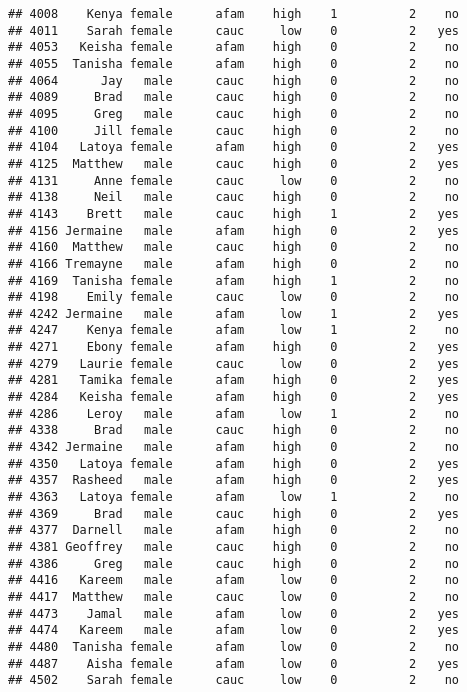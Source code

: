 \documentclass[
]{article}
\begin{document}
\begin{verbatim}
## 4008    Kenya female      afam    high    1          2    no
## 4011    Sarah female      cauc     low    0          2   yes
## 4053   Keisha female      afam    high    0          2    no
## 4055  Tanisha female      afam    high    0          2    no
## 4064      Jay   male      cauc    high    0          2    no
## 4089     Brad   male      cauc    high    0          2    no
## 4095     Greg   male      cauc    high    0          2    no
## 4100     Jill female      cauc    high    0          2    no
## 4104   Latoya female      afam    high    0          2   yes
## 4125  Matthew   male      cauc    high    0          2   yes
## 4131     Anne female      cauc     low    0          2    no
## 4138     Neil   male      cauc    high    0          2    no
## 4143    Brett   male      cauc    high    1          2   yes
## 4156 Jermaine   male      afam    high    0          2   yes
## 4160  Matthew   male      cauc    high    0          2    no
## 4166 Tremayne   male      afam    high    0          2    no
## 4169  Tanisha female      afam    high    1          2    no
## 4198    Emily female      cauc     low    0          2    no
## 4242 Jermaine   male      afam     low    1          2   yes
## 4247    Kenya female      afam     low    1          2    no
## 4271    Ebony female      afam    high    0          2   yes
## 4279   Laurie female      cauc     low    0          2   yes
## 4281   Tamika female      afam    high    0          2   yes
## 4284   Keisha female      afam    high    0          2   yes
## 4286    Leroy   male      afam     low    1          2    no
## 4338     Brad   male      cauc    high    0          2    no
## 4342 Jermaine   male      afam    high    0          2    no
## 4350   Latoya female      afam    high    0          2   yes
## 4357  Rasheed   male      afam    high    0          2   yes
## 4363   Latoya female      afam     low    1          2    no
## 4369     Brad   male      cauc    high    0          2   yes
## 4377  Darnell   male      afam    high    0          2    no
## 4381 Geoffrey   male      cauc    high    0          2    no
## 4386     Greg   male      cauc    high    0          2    no
## 4416   Kareem   male      afam     low    0          2    no
## 4417  Matthew   male      cauc     low    0          2    no
## 4473    Jamal   male      afam     low    0          2   yes
## 4474   Kareem   male      afam     low    0          2   yes
## 4480  Tanisha female      afam     low    0          2    no
## 4487    Aisha female      afam     low    0          2   yes
## 4502    Sarah female      cauc     low    0          2    no

\end{verbatim}
\end{document}
